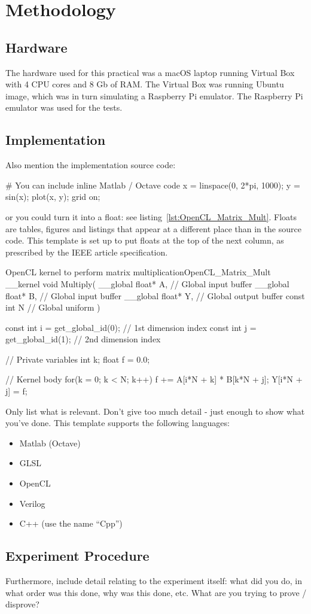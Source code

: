 \section{Methodology}

\subsection{Hardware}
The hardware used for this practical was a macOS laptop running Virtual Box with 4 CPU cores and 8 Gb of RAM. The Virtual Box was running Ubuntu image, which was in turn simulating a Raspberry Pi emulator. The Raspberry Pi emulator was used for the tests.

\subsection{Implementation}
Also mention the implementation source code:

\begin{Matlab}
# You can include inline Matlab / Octave code
x = linspace(0, 2*pi, 1000);
y = sin(x);
plot(x, y); grid on;
\end{Matlab}

or you could turn it into a float: see listing~\ref{lst:OpenCL_Matrix_Mult}.  Floats are tables, figures and listings that appear at a different place than in the source code.  This template is set up to put floats at the top of the next column, as prescribed by the IEEE article specification.

\begin{OpenCL_float}{OpenCL kernel to perform matrix multiplication}{OpenCL_Matrix_Mult}
__kernel void Multiply(
 __global float* A, // Global input buffer
 __global float* B, // Global input buffer
 __global float* Y, // Global output buffer
   const  int    N  // Global uniform
){
 const int i = get_global_id(0); // 1st dimension index
 const int j = get_global_id(1); // 2nd dimension index

 // Private variables
 int   k;
 float f = 0.0;

 // Kernel body
 for(k = 0; k < N; k++) f += A[i*N + k] * B[k*N + j];
 Y[i*N + j] = f;
}
\end{OpenCL_float}

Only list what is relevant.  Don't give too much detail - just enough to show what you've done.  This template supports the following languages:

\begin{itemize}
 \item Matlab (Octave)
 \item GLSL
 \item OpenCL
 \item Verilog
 \item C++ (use the name ``Cpp'')
\end{itemize}
  
\subsection{Experiment Procedure}
Furthermore, include detail relating to the experiment itself: what did you do, in what order was this done, why was this done, etc.  What are you trying to prove / disprove?
